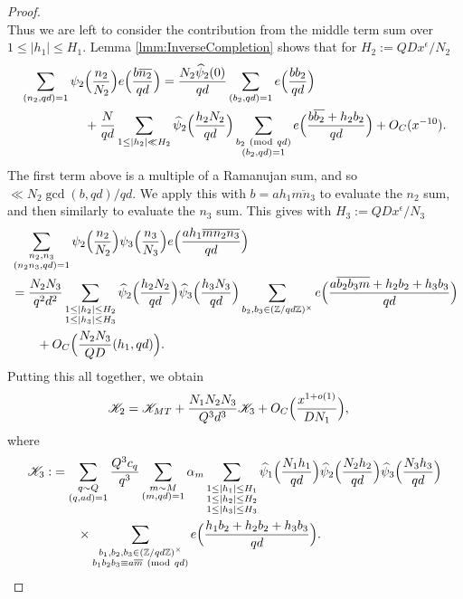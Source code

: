\documentclass[10pt]{amsart}
\theoremstyle{plain}
\numberwithin{equation}{section}
\newcommand{\Mod}[1]{\ (\mathrm{mod}\ #1)}
\renewcommand{\hat}[1]{\widehat #1}
\begin{document}
\begin{proof}
\[\]
Thus we are left to consider the contribution from the middle term sum over $1\le |h_1|\le H_1$. Lemma \ref{lmm:InverseCompletion} shows that for $H_2:=Q D x^\epsilon/N_2$
\begin{align*}
\sum_{(n_2,q d)=1}\psi_2&\Bigl(\frac{n_2}{N_2}\Bigr)e\Bigl(\frac{b\overline{n_2}}{q d}\Bigr)=\frac{N_2\hat{\psi_2}(0)}{q d}\sum_{(b_2,q d)=1}e\Bigl(\frac{b b_2}{q d}\Bigr)\\
&+\frac{N}{q d}\sum_{1\le |h_2|\ll H_2}\hat{\psi_2}\Bigl(\frac{h_2 N_2}{q d}\Bigr)\sum_{\substack{b_2\Mod{q d}\\ (b_2,q d)=1}} e\Bigl(\frac{b\overline{b_2}+h_2 b_2}{q d}\Bigr)+O_C(x^{-10}).
\end{align*}
The first term above is a multiple of a Ramanujan sum, and so $\ll N_2\gcd(b,q d)/q d$. We apply this with $b=ah_1\overline{m n_3}$ to evaluate the $n_2$ sum, and then similarly to evaluate the $n_3$ sum. This gives with $H_3:=Q D x^\epsilon/N_3$ 
\begin{align*}
&\sum_{\substack{n_2,n_3\\ (n_2n_3,q d)=1}}\psi_2\Bigl(\frac{n_2}{N_2}\Bigr)\psi_3\Bigl(\frac{n_3}{N_3}\Bigr)e\Bigl(\frac{ah_1\overline{m n_2n_3}}{q d}\Bigr)\\
&=\frac{N_2N_3}{q^2 d^2}\sum_{\substack{1\le |h_2|\le H_2\\ 1\le |h_3|\le H_3}}\hat{\psi_2}\Bigl(\frac{h_2 N_2}{q d}\Bigr)\hat{\psi_3}\Bigl(\frac{h_3 N_3}{q d}\Bigr)\sum_{b_2,b_3\in(\mathbb{Z}/q d\mathbb{Z})^\times }e\Bigl(\frac{a\overline{b_2 b_3 m}+h_2 b_2+h_3 b_3}{q d}\Bigr)\\
&\qquad+O_C\Bigl(\frac{N_2N_3}{Q D}(h_1,q d)\Bigr).
\end{align*}
Putting this all together, we obtain
\begin{align*}
\mathscr{K}_2&=\mathscr{K}_{MT}+\frac{N_1N_2N_3}{Q^3 d^3}\mathscr{K}_3+O_C\Bigl(\frac{x^{1+o(1)}}{D N_1}\Bigr),
\end{align*}
where
\begin{align*}
\mathscr{K}_3:&=\sum_{\substack{q\sim Q\\ (q,a d)=1}}\frac{Q^3 c_q}{q^3}\sum_{\substack{m\sim M\\ (m,q d)=1}}\alpha_m\sum_{\substack{1\le |h_1|\le H_1 \\ 1\le |h_2|\le H_2\\ 1\le |h_3|\le H_3}}\hat{\psi_1}\Bigl(\frac{N_1 h_1}{q d}\Bigr)\hat{\psi_2}\Bigl(\frac{N_2h_2}{q d}\Bigr)\hat{\psi_3}\Bigl(\frac{N_3h_3}{q d}\Bigr)\\
&\qquad\times\sum_{\substack{b_1,b_2,b_3\in(\mathbb{Z}/q d\mathbb{Z})^\times\\ b_1b_2b_3\equiv a\overline{m}\Mod{q d}}}e\Bigl(\frac{h_1b_2+h_2b_2+h_3b_3}{q d}\Bigr).

\end{align*}
\end{proof}
\end{document}

